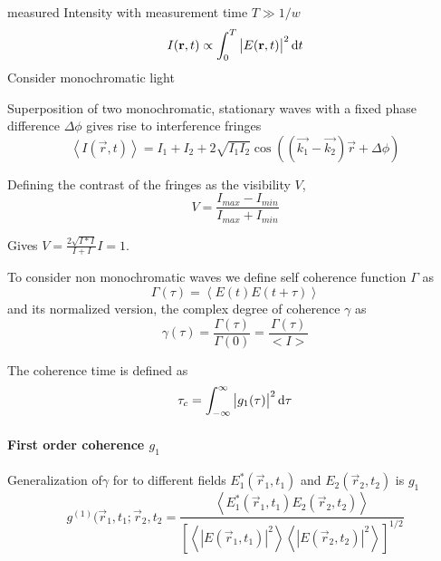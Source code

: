 measured Intensity with measurement time $T\gg1/w$
\begin{equation}
	I(\mathbf{r},t)\propto \int_0^T \left|E(\mathbf{r},t)\right|^2 \operatorname{\mathrm{d}\!} t
\end{equation}
Consider monochromatic light

Superposition of two monochromatic, stationary waves with a fixed phase difference $\Delta \phi$ gives rise to interference fringes
\begin{equation}
	\left<I(\vec{r},t)\right>=I_1+I_2+2\sqrt{I_1I_2}\cos\left((\vec{k_1}-\vec{k_2})\vec{r}+\Delta \phi\right)
\end{equation}

Defining the contrast of the fringes as the visibility $V$,
\begin{equation}
	V=\frac{I_{max}-I_{min}}{I_{max}+I_{min}}
\end{equation} 

Gives $V=\frac{2\sqrt{I*I}}{I+I}I=1$.

To consider non monochromatic waves we define self coherence function $\Gamma$ as 
\begin{equation}
\Gamma(\tau)=\left< E(t)E(t+\tau)\right>
\end{equation}
and its normalized version, the complex degree of coherence $\gamma$ as
\begin{equation}
\gamma(\tau)=\frac{\Gamma(\tau)}{\Gamma(0)} =  \frac{\Gamma(\tau)}{<I>}
\end{equation}



The coherence time is defined as 
\begin{equation}
\tau_c = \int_{-\infty}^{\infty} \left| g_1(\tau)\right|^2 \operatorname{\mathrm{d}\!} \tau 
\end{equation}





\paragraph{First order coherence $g_1$}
Generalization of$\gamma$  for to different fields  $E_1^*(\vec{r}_1,t_1)$ and $E_2(\vec{r}_2,t_2)$ is $g_1$
\begin{equation}
	g^{(1)}(\vec{r}_1,t_1;\vec{r}_2,t_2= \frac
	{\left< E_1^*(\vec{r}_1,t_1)E_2(\vec{r}_2,t_2) \right>}
	{\left[ \left<\left | E(\vec{r}_1,t_1)\right |^2 \right> \left< \left |E(\vec{r}_2,t_2)\right |^2 \right>\right]^{1/2}}	
\end{equation}







